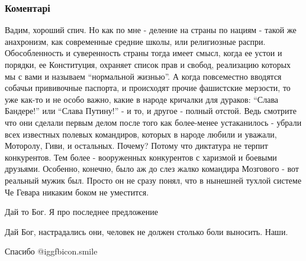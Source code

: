  
 
 
 
 
\subsubsection{Коментарі}

\begin{itemize} %

Вадим, хороший спич. Но как по мне - деление на страны по нациям - такой же
анахронизм, как современные средние школы, или религиозные распри.
Обособленность и суверенность страны тогда имеет смысл, когда ее устои и
порядки, ее Конституция, охраняет список прав и свобод, реализацию которых мы с
вами и называем \enquote{нормальной жизнью}. А когда повсеместно вводятся собачьи
прививочные паспорта, и происходят прочие фашистские мерзости, то уже как-то и
не особо важно, какие в народе кричалки для дураков: \enquote{Слава Бандере!} или
\enquote{Слава Путину!} - и то, и другое - полный отстой. Ведь смотрите что они сделали
первым делом после того как более-менее устаканилось - убрали всех известных
полевых командиров, которых в народе любили и уважали, Моторолу, Гиви, и
остальных. Почему? Потому что диктатура не терпит конкурентов. Тем более -
вооруженных конкурентов с харизмой и боевыми друзьями. Особенно, конечно, было
аж до слез жалко командира Мозгового - вот реальный мужик был. Просто он не
сразу понял, что в нынешней тухлой системе Че Гевара никаким боком не
уместится.

Дай то Бог. Я про последнее предложение

Дай Бог, настрадались они, человек не должен столько боли выносить. Наши.

Спасибо  @igg{fbicon.smile} 
\end{itemize} %
